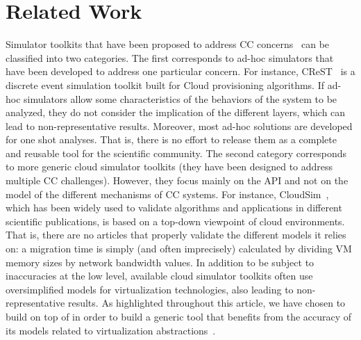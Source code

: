 \section{Related Work}
\label{sec:related}

Simulator toolkits that have been proposed to address CC
concerns~\cite{cloudsim,CC13,DGSIM,greencloud,icancloud} can be
classified into two categories.  The first corresponds to ad-hoc
simulators that have been developed to address one particular
concern. For instance, CReST~\cite{CC13} is a discrete event
simulation toolkit built for Cloud provisioning algorithms. If ad-hoc
simulators allow some characteristics of the behaviors of the system
to be analyzed, they do not consider the implication of the different
layers, which can lead to non-representative results. Moreover, most
ad-hoc solutions are developed for one shot analyses. That is, there
is no effort to release them as a complete and reusable tool for the
scientific community. The second category
\cite{cloudsim,greencloud,icancloud} corresponds to more generic cloud
simulator toolkits (\ie they have been designed to address multiple CC
challenges). However, they focus mainly on the API and not on the
model of the different mechanisms of CC systems. For instance,
CloudSim~\cite{cloudsim}, which has been widely used to validate
algorithms and applications in different scientific publications, is
based on a top-down viewpoint of cloud environments.  That is, there
are no articles that properly validate the different models it relies
on: a migration time is simply (and often imprecisely) calculated by
dividing VM memory sizes by network bandwidth values.
In addition to be subject to inaccuracies at the low level, available
cloud simulator toolkits often use oversimplified models for
virtualization technologies, also leading to non-representative
results. As highlighted throughout this article, we have chosen to
build \vmps on top of \sg in order to build a generic tool that
benefits from the accuracy of its models related to virtualization
abstractions~\cite{Hirofuchi:2013:ALM:2568486.2568524}.




